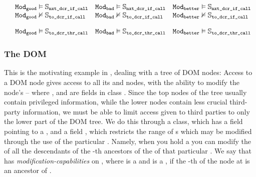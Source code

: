  $\begin{array}{llll}
  & {\texttt{Mod}}_{{\texttt{good}}} \vDash {\ensuremath{{\mathbb{S}}_{{\texttt{nxt\_dcr\_if\_call}}}}}     & {\texttt{Mod}}_{{\texttt{bad}}} \vDash {\ensuremath{{\mathbb{S}}_{{\texttt{nxt\_dcr\_if\_call}}}}}   
  & {\texttt{Mod}}_{{\texttt{better}}} \vDash {\ensuremath{{\mathbb{S}}_{{\texttt{nxt\_dcr\_if\_call}}}}}
  \\
  & {\texttt{Mod}}_{{\texttt{good}}} \nvDash {\ensuremath{{\mathbb{S}}_{{\texttt{to\_dcr\_if\_call}}}}}     & {\texttt{Mod}}_{{\texttt{bad}}} \nvDash {\ensuremath{{\mathbb{S}}_{{\texttt{to\_dcr\_if\_call}}}}}  
  & {\texttt{Mod}}_{{\texttt{better}}} \nvDash {\ensuremath{{\mathbb{S}}_{{\texttt{to\_dcr\_if\_call}}}}}
  \end{array}$
  
  \vspace{.07in} %

 
   $\begin{array}{llll}
  & {\texttt{Mod}}_{{\texttt{good}}} \vDash{\ensuremath{{\mathbb{S}}_{{\texttt{to\_dcr\_thr\_call}}}}}     & {\texttt{Mod}}_{{\texttt{bad}}} \vDash {\ensuremath{{\mathbb{S}}_{{\texttt{to\_dcr\_thr\_call}}}}}  
  & {\texttt{Mod}}_{{\texttt{better}}} \vDash {\ensuremath{{\mathbb{S}}_{{\texttt{to\_dcr\_thr\_call}}}}}
   \end{array}$
 

\label{ss:DOM}

\subsubsection{The DOM}  %
This is the motivating example in \cite{dd},
dealing with a tree of DOM nodes: Access to a DOM node
gives access to all its  and  nodes, with the ability to
modify the node's  -- where  ,  and 
are fields in class . Since the top nodes of the tree
usually contain privileged information, while the lower nodes contain
less crucial third-party information, we must be able to limit 
 access given to third parties to only the lower part of the DOM tree. We do this through a  class, which has a field  pointing to a , and a field , which restricts the range of s which may be modified through the use of the particular . Namely, when you hold a   you can modify the  of all the descendants of the    -th ancestors of the  of that particular .  We say that
 has \emph{modification-capabilities} on , where  is
a   and  is a , if the -th  
of the node at  is an ancestor of .



